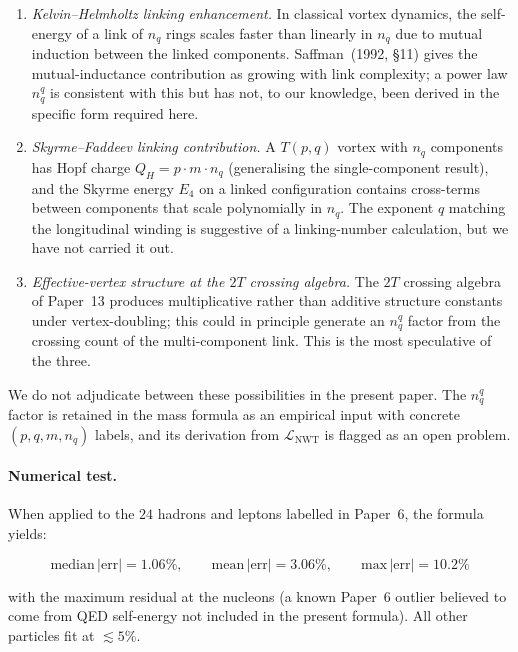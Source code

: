 \documentclass[11pt]{article}
\newcommand{\Lnwt}{\mathcal{L}_\text{NWT}}
\begin{document}
\begin{enumerate}\setlength\itemsep{1pt}
  \item \textit{Kelvin--Helmholtz linking enhancement.}  In
    classical vortex dynamics, the self-energy of a link of
    $n_q$ rings scales faster than linearly in $n_q$ due to
    mutual induction between the linked components.  Saffman~(1992,
    \S11) gives the mutual-inductance contribution as growing with
    link complexity; a power law $n_q^q$ is consistent with this
    but has not, to our knowledge, been derived in the specific
    form required here.
  \item \textit{Skyrme--Faddeev linking contribution.}  A
    $T(p, q)$ vortex with $n_q$ components has Hopf charge
    $Q_H = p \cdot m \cdot n_q$ (generalising the single-component
    result), and the Skyrme energy $E_4$ on a linked configuration
    contains cross-terms between components that scale polynomially
    in $n_q$.  The exponent $q$ matching the longitudinal winding
    is suggestive of a linking-number calculation, but we have not
    carried it out.
  \item \textit{Effective-vertex structure at the $2T$ crossing
    algebra.}  The $2T$ crossing algebra of Paper~13 produces
    multiplicative rather than additive structure constants under
    vertex-doubling; this could in principle generate an $n_q^q$
    factor from the crossing count of the multi-component link.
    This is the most speculative of the three.
\end{enumerate}

We do not adjudicate between these possibilities in the present
paper.  The $n_q^q$ factor is retained in the mass formula as an
empirical input with concrete $(p, q, m, n_q)$ labels, and its
derivation from $\Lnwt$ is flagged as an open problem.

\paragraph{Numerical test.}
When applied to the $24$ hadrons and leptons labelled in Paper~6,
the formula yields:

\begin{equation}
  \text{median}\,|\text{err}| = 1.06\%, \qquad
  \text{mean}\,|\text{err}| = 3.06\%, \qquad
  \text{max}\,|\text{err}| = 10.2\%
\end{equation}

with the maximum residual at the nucleons (a known Paper~6 outlier
believed to come from QED self-energy not included in the present
formula).  All other particles fit at $\lesssim 5\%$.
\end{document}
